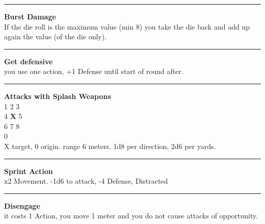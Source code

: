\documentclass[a4paper,12 pt,openany]{book}
\newcommand{\linex}{\rule{\textwidth}{0.4pt}}
\begin{document}
\begin{textblock*}{6.2cm}
\linex

\textbf{Burst Damage}\\
If the die roll is the maximum value (min 8) you take the die back and add up again the value (of the die only).

\linex

\textbf{Get defensive}\\
you use one action, +1 Defense until start of round after.


\linex

\textbf{Attacks with Splash Weapons}\\
1 2 3\\
4 \textbf{X} 5\\
6 7 8\\
0\\
X target, 0 origin. range 6 meters. 1d8 per direction, 2d6 per yards.

\linex

\textbf{Sprint Action}\\
x2 Movement. -1d6 to attack, -4 Defense, Distracted

\linex

\textbf{Disengage}\\
it costs 1 Action, you move 1 meter and you do not cause attacks of opportunity.

\end{textblock*}

~\newpage
\end{document}
